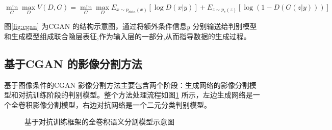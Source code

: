 \begin{equation}
  \label{eq:4-3}
  \mathop{\min}_{G} \mathop{\max}_{D} V(D,G) = \mathop{\min}_{G} \mathop{\max}_{D} E_{x \sim p_{data}(x)} [\log D(x|y)] + E_{z \sim p_{z}(z)}[ \log (1-D(G(z|y)))]
\end{equation}

图\ref{fig:cgan} 为CGAN 的结构示意图，通过将额外条件信息$y$ 分别输送给判别模型和生成模型组成联合隐层表征,作为输入层的一部分,从而指导数据的生成过程。


\subsection{基于CGAN 的影像分割方法}
\label{sec:first-2}
基于图像条件的CGAN 影像分割方法主要包含两个阶段：生成网络的影像分割模型和对抗训练阶段的判别模型。整个方法处理流程如图\ref{fig:gan-fcn} 所示，左边生成网络是一个全卷积影像分割模型，右边对抗网络是一个二元分类判别模型。

\begin{figure}[htb]
  \centering
  \begin{center}
    \caption{基于对抗训练框架的全卷积语义分割模型示意图}\label{fig:gan-fcn}
  \end{center}
\end{figure}


